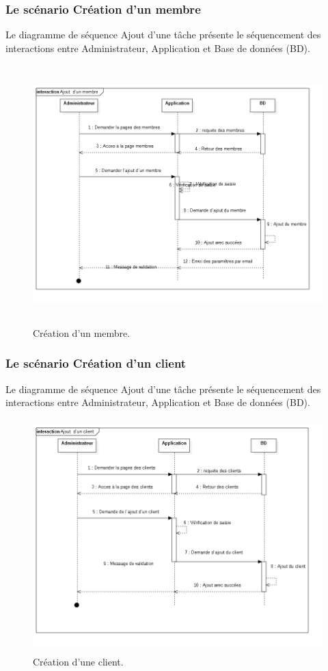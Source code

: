 \newpage
\subsubsection{Le sc\'{e}nario \guillemotleft{} Cr\'{e}ation d'un membre \guillemotright{}}

Le diagramme de s\'{e}quence \guillemotleft{} Ajout d'une t\^{a}che \guillemotright{} pr\'{e}sente le s\'{e}quencement
des interactions entre Administrateur, Application et Base de donn\'{e}es (BD).



\begin{figure}[H]
\center
\includegraphics[width=14cm,height=10cm]{./figures/seq/E.png}
\caption{Cr\'{e}ation d'un membre.}
\end{figure}


\subsubsection{Le sc\'{e}nario \guillemotleft{} Cr\'{e}ation d'un client\guillemotright{}}
Le diagramme de s\'{e}quence \guillemotleft{} Ajout d'une t\^{a}che \guillemotright{} pr\'{e}sente le s\'{e}quencement
des interactions entre Administrateur, Application et Base de donn\'{e}es (BD).


\begin{figure}[H]
\center
\includegraphics[width=14cm,height=9cm]{./figures/seq/F.png}
\caption{Cr\'{e}ation d'une client.}
\end{figure}

